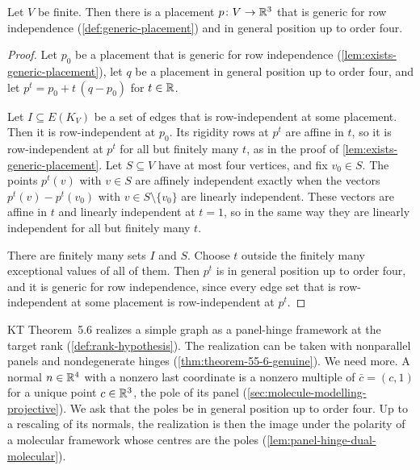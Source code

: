 \begin{lemma}
  \label{lem:exists-generic-general-position}
  \leanok
  Let $V$ be finite. Then there is a placement $p \colon V \to {\mathbb{R}}^3$ that
  is generic for row independence (\cref{def:generic-placement}) and in
  general position up to order four.
\end{lemma}
\begin{proof}
  \leanok
  Let $p_0$ be a placement that is generic for row independence
  (\cref{lem:exists-generic-placement}), let $q$ be a placement in general
  position up to order four, and let $p^t = p_0 + t\,(q - p_0)$ for
  $t \in {\mathbb{R}}$.

  Let $I \subseteq E(K_V)$ be a set of edges that is row-independent at
  some placement. Then it is row-independent at $p_0$. Its rigidity rows
  at $p^t$ are affine in $t$, so it is row-independent at $p^t$ for all
  but finitely many $t$, as in the proof of
  \cref{lem:exists-generic-placement}. Let $S \subseteq V$ have at most four
  vertices, and fix $v_0 \in S$. The points $p^t(v)$ with $v \in S$ are
  affinely independent exactly when the vectors $p^t(v) - p^t(v_0)$ with
  $v \in S \setminus \{v_0\}$ are linearly independent. These vectors are
  affine in $t$ and linearly independent at $t = 1$, so in the same way
  they are linearly independent for all but finitely many $t$.

  There are finitely many sets $I$ and $S$. Choose $t$ outside the
  finitely many exceptional values of all of them. Then $p^t$ is in
  general position up to order four, and it is generic for row
  independence, since every edge set that is row-independent at some
  placement is row-independent at $p^t$.
\end{proof}

KT Theorem~5.6 realizes a simple graph as a panel-hinge framework at the
target rank (\cref{def:rank-hypothesis}). The realization can be taken
with nonparallel panels and nondegenerate hinges
(\cref{thm:theorem-55-6-genuine}). We need more. A normal $n \in {\mathbb{R}}^4$ with a nonzero last coordinate is a nonzero
multiple of $\bar c = (c, 1)$ for a unique point $c \in {\mathbb{R}}^3$, the pole
of its panel
(\cref{sec:molecule-modelling-projective}). We ask that the poles be in
general position up to order four. Up to a rescaling of its normals,
the realization is then the image under the polarity of a molecular
framework whose centres are the poles
(\cref{lem:panel-hinge-dual-molecular}).

